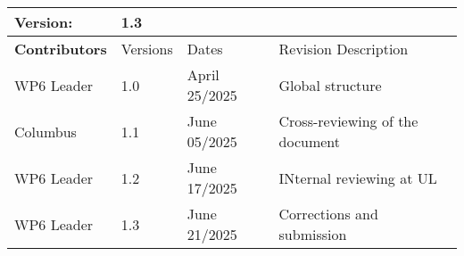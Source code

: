 \begin{tabular}{ >{\raggedright\arraybackslash}p{3cm}| p{2cm} p{4cm} p{6cm} }
    \toprule
    \textbf{Version}: & \multicolumn{3}{l}{ 1.3} \\ \midrule
    \textbf{Contributors}  & Versions    & Dates       & Revision Description \\ \midrule
    WP6 Leader  & 1.0    & April 25/2025  & Global structure  \\ 
    Columbus  & 1.1    & June 05/2025  & Cross-reviewing of the document  \\ 
    WP6 Leader  & 1.2   & June 17/2025  & INternal reviewing at UL \\ 
    WP6 Leader  & 1.3   & June 21/2025  & Corrections and submission  \\ 
    \bottomrule
\end{tabular}  

